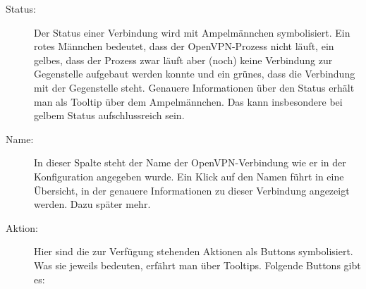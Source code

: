 \begin{description}
\item [Status:] Der Status einer Verbindung wird mit Ampelmännchen
  symbolisiert. Ein rotes Männchen bedeutet, dass der OpenVPN-Prozess
  nicht läuft, ein gelbes, dass der Prozess zwar läuft aber (noch)
  keine Verbindung zur Gegenstelle aufgebaut werden konnte und ein
  grünes, dass die Verbindung mit der Gegenstelle \glqq{}steht\grqq{}.
  Genauere Informationen über den Status erhält man als Tooltip über
  dem Ampelmännchen. Das kann insbesondere bei \glqq{}gelbem\grqq{}
  Status aufschlussreich sein.

\item [Name:] In dieser Spalte steht der Name der OpenVPN-Verbindung
  wie er in der Konfiguration angegeben wurde. Ein Klick auf den Namen
  führt in eine Übersicht, in der genauere Informationen zu dieser
  Verbindung angezeigt werden. Dazu später mehr.

\item [Aktion:] Hier sind die zur Verfügung stehenden Aktionen als
  Buttons symbolisiert. Was sie jeweils bedeuten, erfährt man über
  Tooltips. Folgende Buttons gibt es:


\end{description}

